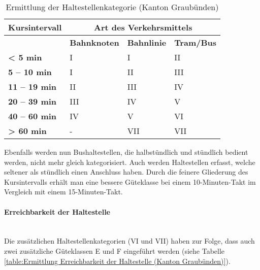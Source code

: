 \begin{table}[ht]
    \begin{tabular}[c]{l p{4.0cm} p{4.0cm} p{4.0cm}}
        \toprule
        \textbf{Kursintervall}
                                & \multicolumn{3}{c}{\textbf{Art des Verkehrsmittels}}\\
        \midrule
        \textbf{}
                                & \textbf{Bahnknoten}
                                & \textbf{Bahnlinie}
                                & \textbf{Tram/Bus}\\
        \textbf{< 5 min}
                                & I
                                & I
                                & II\\
        \cellcolor{red!25}\textbf{5 -- 10 min}
                                & I
                                & II
                                & III\\
        \cellcolor{red!25}\textbf{11 -- 19 min}
                                & II
                                & III
                                & IV\\
        \textbf{20 -- 39 min}
                                & III
                                & IV
                                & V\\
        \textbf{40 -- 60 min}
                                & IV
                                & V
                                & \cellcolor{red!25}VI\\
        \cellcolor{red!25}\textbf{> 60 min}
                                & -
                                & \cellcolor{red!25}VII
                                & \cellcolor{red!25}VII\\
        \bottomrule
    \end{tabular}
    \caption{Ermittlung der Haltestellenkategorie (Kanton Graubünden)}
    \label{table:Ermittlung der Haltestellenkategorie (Kanton Graubünden)}
\end{table}

Ebenfalls werden nun Bushaltestellen, die halbstündlich und stündlich bedient werden, nicht mehr gleich kategorisiert.
Auch werden Haltestellen erfasst, welche seltener als stündlich einen Anschluss haben.
Durch die feinere Gliederung des Kursintervalls erhält man eine bessere Güteklasse bei einem 10-Minuten-Takt im Vergleich mit einem 15-Minuten-Takt.

\paragraph{Erreichbarkeit der Haltestelle}~\\
\label{Berechnungsmethodik Kanton Graubünden:Erreichbarkeit der Haltestelle}
Die zusätzlichen Haltestellenkategorien (VI und VII) haben zur Folge, dass auch zwei zusätzliche Güteklassen E und F eingeführt werden (siehe Tabelle \ref{table:Ermittlung Erreichbarkeit der Haltestelle (Kanton Graubünden)}).

